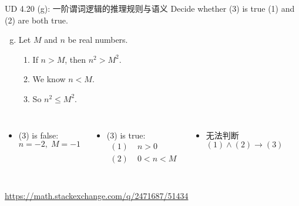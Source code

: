 \begin{frame}{}
  \begin{exampleblock}{UD 4.20 (g): 一阶谓词逻辑的推理规则与语义}
    Decide whether (3) is true  (1) and (2) are both true.

    \begin{enumerate}[(a)]
      \setcounter{enumi}{6}
      \item Let $M$ and $n$ be real numbers.
	\begin{enumerate}[(1)]
	  \item If $n > M$, then $n^2 > M^2$.
	  \item We know $n < M$.
	  \item So $n^2 \le M^2$.
	\end{enumerate}
    \end{enumerate}
  \end{exampleblock}

  \begin{columns}[t]
    \pause
      \begin{itemize}
	\item (3) is false: 
	  \[
	    n = -2, \; M = -1
	  \]
      \end{itemize}
    \pause
      \begin{itemize}
        \item (3) is true:
	\begin{align*}
	  (1)\; & n > 0 \\
	  (2)\; & 0 < n < M
	\end{align*}
      \end{itemize}
    \pause
      \begin{itemize}
        \item 无法判断
	\[
	  (1) \land (2) \to (3)
	\]
      \end{itemize}
  \end{columns}
  \pause
  \begin{columns}
      \vspace{-0.80cm}
      \centerline{\scriptsize \url{https://math.stackexchange.com/q/2471687/51434}}
  \end{columns}
\end{frame}

